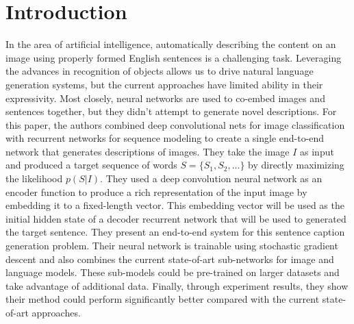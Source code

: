 \documentclass[fleqn,10pt]{SelfArx} %
\affiliation{\textsuperscript{1}\textit{Department of Industrial Engineering, University of Illinois at Urbana Champaign, Champaign, IL}} %
\affiliation{\textsuperscript{2}\textit{Department of Statistics, University of Illinois at Urbana Champaign, Champaign, IL}} %
\begin{document}
\flushbottom %

\maketitle %

\tableofcontents %

\thispagestyle{empty} %


\section{Introduction} %


In the area of artificial intelligence, automatically describing the content on an image using properly formed English sentences is a challenging task. Leveraging the advances in recognition of objects allows us to drive natural language generation systems, but the current approaches have limited ability in their expressivity. Most closely, neural networks are used to co-embed images and sentences together, but they didn't attempt to generate novel descriptions. For this paper, the authors combined deep convolutional nets for image classification with recurrent networks for sequence modeling to create a single end-to-end network that generates descriptions of images. They take the image $I$ as input and produced a target sequence of words $S = \{S_1, S_2, \ldots\}$ by directly maximizing the likelihood $p(S|I)$. They used a deep convolution neural network as an encoder function to produce a rich representation of the input image by embedding it to a fixed-length vector. This embedding vector will be used as the initial hidden state of a decoder recurrent network that will be used to generated the target sentence. They present an end-to-end system for this sentence caption generation problem. Their neural network is trainable using stochastic gradient descent and also combines the current state-of-art sub-networks for image and language models. These sub-models could be pre-trained on larger datasets and take advantage of additional data. Finally, through experiment results, they show their method could perform significantly better compared with the current state-of-art approaches.
\end{document}
